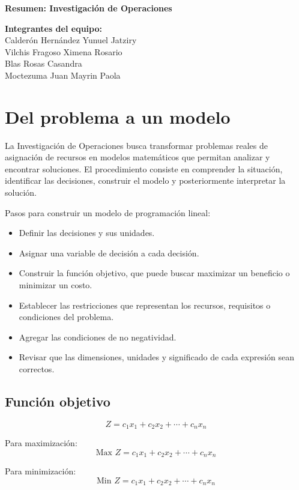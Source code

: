\documentclass[12pt,letterpaper]{article}
\begin{document}
\begin{center}
  {\Large\textbf{Resumen: Investigación de Operaciones}}
\end{center}

\textbf{Integrantes del equipo:}\\
Calderón Hernández Yunuel Jatziry\\
Vilchis Fragoso Ximena Rosario\\
Blas Rosas Casandra\\
Moctezuma Juan Mayrin Paola

\section*{Del problema a un modelo}

La Investigación de Operaciones busca transformar problemas reales de asignación de recursos en modelos matemáticos que permitan analizar y encontrar soluciones. El procedimiento consiste en comprender la situación, identificar las decisiones, construir el modelo y posteriormente interpretar la solución.

Pasos para construir un modelo de programación lineal:
\begin{itemize}
  \item Definir las decisiones y sus unidades.
  \item Asignar una variable de decisión a cada decisión.
  \item Construir la función objetivo, que puede buscar maximizar un beneficio o minimizar un costo.
  \item Establecer las restricciones que representan los recursos, requisitos o condiciones del problema.
  \item Agregar las condiciones de no negatividad.
  \item Revisar que las dimensiones, unidades y significado de cada expresión sean correctos.
\end{itemize}

\subsection*{Función objetivo}

\[ Z = c_1x_1 + c_2x_2 + \cdots + c_nx_n \]

Para maximización:
\[ \text{Max } Z = c_1x_1 + c_2x_2 + \cdots + c_nx_n \]

Para minimización:
\[ \text{Min } Z = c_1x_1 + c_2x_2 + \cdots + c_nx_n \]
\end{document}
